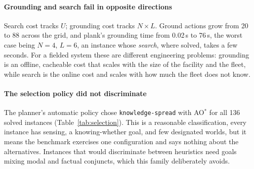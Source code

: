 \paragraph{Grounding and search fail in opposite directions}
Search cost tracks $U$; grounding cost tracks $N\times L$. Ground actions grow
from 20 to 88 across the grid, and \textsf{plank}'s grounding time from 0.02\,s
to 76\,s, the worst case being $N=4$, $L=6$, an instance whose \emph{search},
where solved, takes a few seconds. For a fielded system these are different
engineering problems: grounding is an offline, cacheable cost that scales with
the size of the facility and the fleet, while search is the online cost and
scales with how much the fleet does not know.

\paragraph{The selection policy did not discriminate}
The planner's automatic policy chose \texttt{knowledge-spread} with AO$^\ast$
for all 136 solved instances (Table~\ref{tab:selection}). This is a reasonable
classification, every instance has sensing, a knowing-whether goal, and few
designated worlds, but it means the benchmark exercises one configuration
and says nothing about the alternatives. Instances that would discriminate
between heuristics need goals mixing modal and factual conjuncts, which this
family deliberately avoids.

